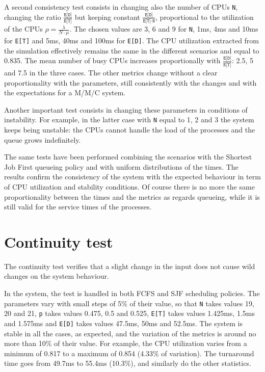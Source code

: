 A second consistency test consists in changing also the number of CPUs \texttt{N},
changing the ratio $\frac{\texttt{E[D]}}{\texttt{E[T]}}$ but keeping constant
$\frac{\texttt{E[D]}}{\texttt{E[T]}\cdot \texttt{N}}$, proportional to the
utilization of the CPUs $\rho=\frac{\lambda}{N\cdot \mu}$. The chosen values
are 3, 6 and 9 for \texttt{N}, 1ms, 4ms and 10ms for \texttt{E[T]} and 
5ms, 40ms and 100ms for \texttt{E[D]}. The CPU utilization extracted from
the simulation effectively remains the same in the different scenarios and equal
to 0.835. The mean number of busy CPUs increases proportionally with
$\frac{\texttt{E[D]}}{\texttt{E[T]}}$: 2.5, 5 and 7.5 in the three cases. The other 
metrics change without a clear proportionality with the parameters, still consistently 
with the changes and with the expectations for a M/M/C system.

Another important test consists in changing these parameters in conditions
of instability. For example, in the latter case with \texttt{N} equal to 1, 2 and 3
the system keeps being unstable: the CPUs cannot handle the load of
the processes and the queue grows indefinitely.

The same tests have been performed combining the scenarios with the Shortest 
Job First queueing policy and with uniform distributions of the times. The results
confirm the consistency of the system with the expected behaviour in term of
CPU utilization and stability conditions. Of course there is no more the same
proportionality between the times and the metrics as regards queueing, while it 
is still valid for the service times of the processes.

\section{Continuity test}
The continuity test verifies that a slight change in the input does not 
cause wild changes on the system behaviour.

In the system, the test is handled in both FCFS and SJF scheduling policies.
The parameters vary with small steps of 5\% of their value, so that 
\texttt{N} takes values 19, 20 and 21, \texttt{p} takes values 0.475, 0.5 and 0.525,
\texttt{E[T]} takes values 1.425ms, 1.5ms and 1.575ms and \texttt{E[D]} takes values
47.5ms, 50ms and 52.5ms. The system is stable in all the cases, as expected,
and the variation of the metrics is around no more than 10\% of their value. For
example, the CPU utilization varies from a minimum of 0.817 to a maximum of 0.854 (4.33\% of variation).
The turnaround time goes from 49.7ms to 55.4ms (10.3\%), and similarly do the other
statistics.



